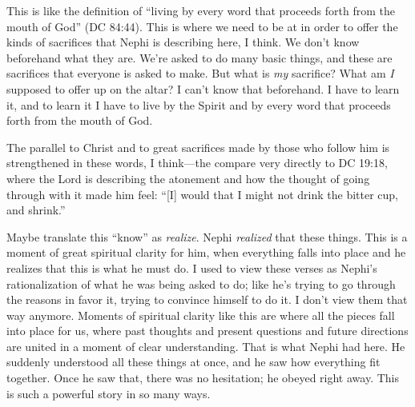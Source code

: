 \begin{compactdesc}
		\item[6$\vert$]
		\begin{compactdesc}
		\item[Led by the Spirit, not knowing beforehand...] This is like the definition of ``living by every word that proceeds forth from the mouth of God'' (DC 84:44). This is where we need to be at in order to offer the kinds of sacrifices that Nephi is describing here, I think. We don't know beforehand what they are. We're asked to do many basic things, and these are sacrifices that everyone is asked to make. But what is \textit{my} sacrifice? What am \textit{I} supposed to offer up on the altar? I can't know that beforehand. I have to learn it, and to learn it I have to live by the Spirit and by every word that proceeds forth from the mouth of God.
		\end{compactdesc}

		\item[10$\vert$]
		\begin{compactdesc}
		\item[And I shrunk and would that I might not slay him] The parallel to Christ and to great sacrifices made by those who follow him is strengthened in these words, I think---the compare very directly to DC 19:18, where the Lord is describing the atonement and how the thought of going through with it made him feel: ``[I] would that I might not drink the bitter cup, and shrink.''
		\end{compactdesc}

		\item[16--17$\vert$]
		\begin{compactdesc}
		\item[I also knew.../I knew...] Maybe translate this ``know'' as \textit{realize}. Nephi \textit{realized} that these things. This is a moment of great spiritual clarity for him, when everything falls into place and he realizes that this is what he must do. I used to view these verses as Nephi's rationalization of what he was being asked to do; like he's trying to go through the reasons in favor it, trying to convince himself to do it. I don't view them that way anymore. Moments of spiritual clarity like this are where all the pieces fall into place for us, where past thoughts and present questions and future directions are united in a moment of clear understanding. That is what Nephi had here. He suddenly understood all these things at once, and he saw how everything fit together. Once he saw that, there was no hesitation; he obeyed right away. This is such a powerful story in so many ways.
		

\end{compactdesc}
\end{compactdesc}
